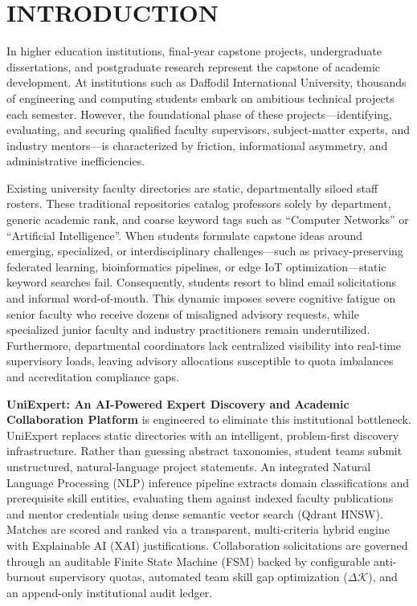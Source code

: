 \chapter{INTRODUCTION}
\label{ch:introduction}

In higher education institutions, final-year capstone projects, undergraduate dissertations, and postgraduate research represent the capstone of academic development. At institutions such as Daffodil International University, thousands of engineering and computing students embark on ambitious technical projects each semester. However, the foundational phase of these projects—identifying, evaluating, and securing qualified faculty supervisors, subject-matter experts, and industry mentors—is characterized by friction, informational asymmetry, and administrative inefficiencies.

Existing university faculty directories are static, departmentally siloed staff rosters. These traditional repositories catalog professors solely by department, generic academic rank, and coarse keyword tags such as ``Computer Networks'' or ``Artificial Intelligence''. When students formulate capstone ideas around emerging, specialized, or interdisciplinary challenges—such as privacy-preserving federated learning, bioinformatics pipelines, or edge IoT optimization—static keyword searches fail. Consequently, students resort to blind email solicitations and informal word-of-mouth. This dynamic imposes severe cognitive fatigue on senior faculty who receive dozens of misaligned advisory requests, while specialized junior faculty and industry practitioners remain underutilized. Furthermore, departmental coordinators lack centralized visibility into real-time supervisory loads, leaving advisory allocations susceptible to quota imbalances and accreditation compliance gaps.

\textbf{UniExpert: An AI-Powered Expert Discovery and Academic Collaboration Platform} is engineered to eliminate this institutional bottleneck. UniExpert replaces static directories with an intelligent, problem-first discovery infrastructure. Rather than guessing abstract taxonomies, student teams submit unstructured, natural-language project statements. An integrated Natural Language Processing (NLP) inference pipeline extracts domain classifications and prerequisite skill entities, evaluating them against indexed faculty publications and mentor credentials using dense semantic vector search (Qdrant HNSW). Matches are scored and ranked via a transparent, multi-criteria hybrid engine with Explainable AI (XAI) justifications. Collaboration solicitations are governed through an auditable Finite State Machine (FSM) backed by configurable anti-burnout supervisory quotas, automated team skill gap optimization ($\Delta\mathcal{K}$), and an append-only institutional audit ledger.

